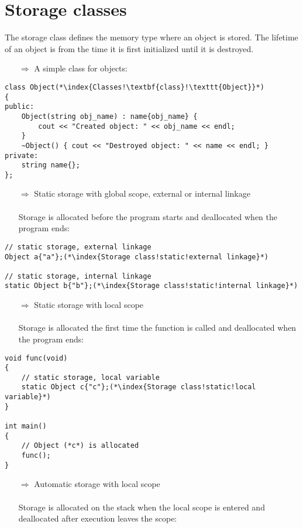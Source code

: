 \documentclass[10pt]{article}
\begin{document}
\section{Storage classes}
\small
The storage class defines the memory type where an object is stored. The lifetime of an object is from the time it is first initialized until it is destroyed.
\begin{enumerate}
\item[$\Rightarrow$] A simple class for objects:
\end{enumerate}
\begin{lstlisting}
class Object(*\index{Classes!\textbf{class}!\texttt{Object}}*)
{
public:
    Object(string obj_name) : name{obj_name} {
        cout << "Created object: " << obj_name << endl;
    }
    ~Object() { cout << "Destroyed object: " << name << endl; }
private:
    string name{};
};
\end{lstlisting}
\begin{enumerate}
\item[$\Rightarrow$] Static storage with global scope, external or internal linkage\\ \\ Storage is allocated before the program starts and deallocated when the program ends:
\end{enumerate}
\begin{lstlisting}
// static storage, external linkage
Object a{"a"};(*\index{Storage class!static!external linkage}*)

// static storage, internal linkage
static Object b{"b"};(*\index{Storage class!static!internal linkage}*)
\end{lstlisting}
\begin{enumerate}
\item[$\Rightarrow$] Static storage with local scope\\ \\ Storage is allocated the first time the function is called and deallocated when the program ends:
\end{enumerate}
\begin{lstlisting}
void func(void)
{
    // static storage, local variable
    static Object c{"c"};(*\index{Storage class!static!local variable}*)
}

int main()
{
    // Object (*c*) is allocated
    func();
}
\end{lstlisting}
\begin{enumerate}
\item[$\Rightarrow$] Automatic storage with local scope\\ \\ Storage is allocated on the stack when the local scope is entered and deallocated after execution leaves the scope:
\end{enumerate}
\end{document}
